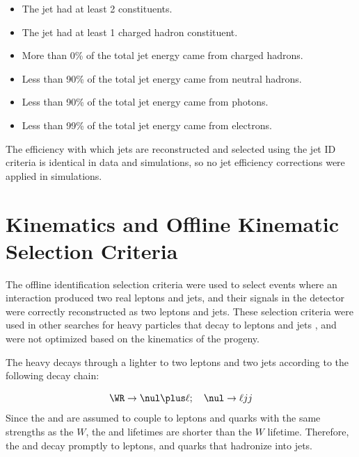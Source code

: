 \begin{itemize}
	\item The jet had at least 2 constituents.
	\item The jet had at least 1 charged hadron constituent.
	\item More than 0\% of the total jet energy came from charged hadrons.
	\item Less than 90\% of the total jet energy came from neutral hadrons.
	\item Less than 90\% of the total jet energy came from photons.
	\item Less than 99\% of the total jet energy came from electrons.
\end{itemize}

The efficiency with which jets are reconstructed and selected using the jet ID criteria is identical in data and simulations, so 
no jet efficiency corrections were applied in simulations.


\section{\WR Kinematics and Offline Kinematic Selection Criteria}
\label{sec:signalAndBkgnds}
The offline identification selection criteria were used to select events where an interaction produced two real leptons and jets, 
and their signals in the detector were correctly reconstructed as two leptons and jets.  These selection criteria were used in other 
searches for heavy particles that decay to leptons and jets \cite{exoLeptJetResults}, and were not optimized based on the kinematics of 
the \WR progeny.

The heavy \WR decays through a lighter \nul to two leptons and two jets according to the following decay chain:

\begin{equation}
	\WR \rightarrow \nul \plus \ell ; \quad \nul \rightarrow \ell jj
\end{equation}
Since the \WR and \nul are assumed to couple to leptons and quarks with the same strengths as the $W$, the \WR and \nul lifetimes are 
shorter than the $W$ lifetime.  Therefore, the \WR and \nul decay promptly to leptons, and quarks that hadronize into jets.


